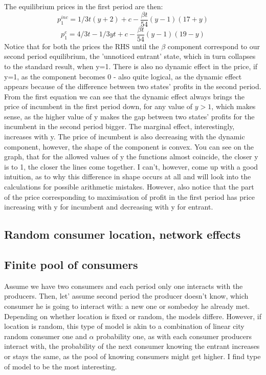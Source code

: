 \documentclass{article}
\begin{document}
The equilibrium prices in the first period are then:
$$
p^{inc}_1 =1/3t(y+ 2) + c - \frac{\beta t }{54}(y-1)(17+y) $$
$$ p^{e}_1 =4/3t - 1/3yt + c - \frac{\beta t}{54}(y-1)(19-y)$$
Notice that for both the prices the RHS until the $ \beta$ component correspond to our second period equilibrium, the 'unnoticed entrant' state, which in turn collapses to the standard result, when y=1. There is also no dynamic effect in the price, if y=1, as the component becomes 0 - also quite logical, as the dynamic effect appears because of the difference between two states' profits in the second period. From the first equation we can see that the dynamic effect always brings the price of incumbent in the first period down, for any value of $y>1$, which makes sense, as the higher value of y makes the gap between two states' profits for the incumbent in the second period bigger. The marginal effect, interestingly, increases with y. The price of incumbent is also decreasing with the dynamic component, however, the shape of the component is convex. You can see on the graph, that for the allowed values of y the functions almost coincide, the closer y is to 1, the closer the lines come together. I can't, however, come up with a good intuition, as to why this difference in shape occurs at all and will look into the calculations for possible arithmetic mistakes. However, also notice that the part of the price corresponding to maximisation of profit in the first period has price increasing with y for incumbent and decreasing with y for entrant.



\subsection{Random consumer location, network effects}


\subsection{Finite pool of consumers}
Assume we have two consumers and each period only one interacts with the producers. Then, let' assume second period the producer doesn't know, which consumer he is going to interact with: a new one or sombedoy he already met. Depending on whether location is fixed or random, the models differe. However, if location is random, this type of model is akin to a combination of linear city random consumer one and $\alpha$ probability one, as with each consumer producers interact with, the probability of the next consumer knowing the entrant increases or stays the same, as the pool of knowing consumers might get higher. I find type of model to be the most interesting.







%
    
\end{document}
